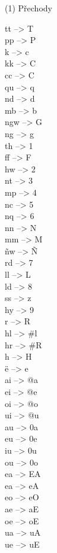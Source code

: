 \documentclass{article}
\begin{document}
\begin{multicols}{6}

(1) Přechody

 tt  -->  T \\
 pp  -->  P \\
 k  -->  c \\
 kk  -->  C \\
 cc  -->  C \\
 qu  -->  q \\
 nd  -->  d \\
 mb  -->  b \\
 ngw  -->  G \\
 ng  -->  g \\
 th  -->  1 \\
 ff  -->  F \\
 hw  -->  2 \\
 nt  --> 3 \\
 mp  -->  4 \\
 nc  -->  5 \\
 nq  --> 6 \\
 nn --> N \\
 mm -->  M \\
 ñw  -->  Ñ \\
 rd  -->  7 \\
 ll  -->  L \\
 ld  -->  8 \\
 ss  -->  z \\
 hy  -->  9 \\
  r  -->   R \\
 hl  -->  \#l \\
 hr  -->  \#R \\
  h  -->   H \\
 ë  -->  e \\
 ai  -->  @a \\
 ei  -->  @e \\
 oi  -->  @o \\
 ui  -->  @u \\
 au  -->  0a \\
 eu  -->  0e \\
 iu  -->  0u \\
 ou  -->  0o \\
 ea  -->   EA \\
 ea  -->  eA \\
 eo  -->  eO \\
 ae  -->  aE \\
 oe  -->  oE \\
 ua  -->  uA \\
 ue  -->  uE \\

\end{multicols}
\end{document}
